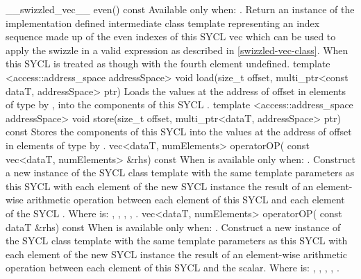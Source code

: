  \addRow
    {\__swizzled_vec__ even() const}
    {
      Available only when: .
      Return an instance of the implementation defined intermediate class template  representing an index sequence made up of the even indexes of this SYCL vec which can be used to apply the swizzle in a valid expression as described in \ref{swizzled-vec-class}. When  this SYCL  is treated as though  with the fourth element undefined.
    }
  \addRowTwoL
  {template <access::address_space addressSpace>}
  {void load(size_t offset, multi_ptr<const dataT, addressSpace> ptr)}
  {
    Loads the values at the address of  offset in elements of type  by , into the components of this SYCL .
  }
  \addRowTwoL
  {template <access::address_space addressSpace>}
  {void store(size_t offset, multi_ptr<dataT, addressSpace> ptr) const}
  {
    Stores the components of this SYCL  into the values at the address of  offset in elements of type  by .
  }
  \addRowTwoL
  {vec<dataT, numElements> operatorOP(}
  {  const vec<dataT, numElements> \&rhs) const}
  {
    When  is \codeinline{\%} available only when: .
    \newline
    Construct a new instance of the SYCL  class template with the same template parameters as this SYCL  with each element of the new SYCL  instance the result of an element-wise  arithmetic operation between each element of this SYCL  and each element of the  SYCL .
    \newline \newline
    Where  is: \codeinline{+}, \codeinline{-}, \codeinline{*}, \codeinline{/}, \codeinline{\%}.
  }
  \addRowTwoL
  {vec<dataT, numElements> operatorOP(}
  {  const dataT \&rhs) const}
  {
    When  is \codeinline{\%} available only when: .
    \newline
    Construct a new instance of the SYCL  class template with the same template parameters as this SYCL  with each element of the new SYCL  instance the result of an element-wise  arithmetic operation between each element of this SYCL  and the  scalar.
    \newline \newline
    Where  is: \codeinline{+}, \codeinline{-}, \codeinline{*}, \codeinline{/}, \codeinline{\%}.
  }
